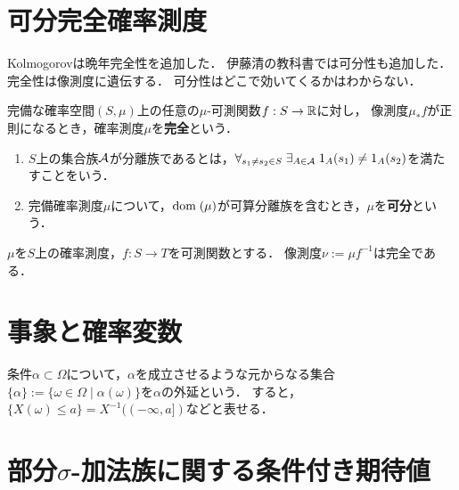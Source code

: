 \documentclass[uplatex,dvipdfmx]{jsreport}
\begin{document}
\section{可分完全確率測度}

\begin{tcolorbox}[colframe=ForestGreen, colback=ForestGreen!10!white,breakable,colbacktitle=ForestGreen!40!white,coltitle=black,fonttitle=\bfseries\sffamily,
title=]
    Kolmogorovは晩年完全性を追加した．
    伊藤清の教科書では可分性も追加した．
    完全性は像測度に遺伝する．
    可分性はどこで効いてくるかはわからない．
\end{tcolorbox}

\begin{definition}\label{def-perfect-measure}
    完備な確率空間$(S,\mu)$上の任意の$\mu$-可測関数$f:S\to\mathbb{R}$に対し，
    像測度$\mu_*f$が正則になるとき，確率測度$\mu$を\textbf{完全}という．
\end{definition}

\begin{definition}\mbox{}
    \begin{enumerate}
        \item $S$上の集合族$\mathcal{A}$が分離族であるとは，$\forall_{s_1\ne s_2\in S}\;\exists_{A\in\mathcal{A}}\;1_A(s_1)\ne 1_A(s_2)$を満たすことをいう．
        \item 完備確率測度$\mu$について，$\mathrm{dom}\;(\mu)$が可算分離族を含むとき，$\mu$を\textbf{可分}という．
    \end{enumerate}
\end{definition}

\begin{theorem}
    $\mu$を$S$上の確率測度，$f:S\to T$を可測関数とする．
    像測度$\nu:=\mu f^{-1}$は完全である．
\end{theorem}

\section{事象と確率変数}

\begin{notation}[extension]
    条件$\alpha\subset\Omega$について，$\alpha$を成立させるような元からなる集合$\{\alpha\}:=\{\omega\in\Omega\mid \alpha(\omega)\}$を$\alpha$の外延という．
    すると，$\{X(\omega)\le a\}=X^{-1}((-\infty,a])$などと表せる．
\end{notation}

\section{部分$\sigma$-加法族に関する条件付き期待値}
\end{document}
